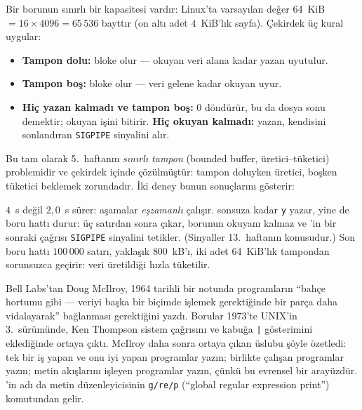 Bir borunun sınırlı bir kapasitesi vardır: Linux'ta varsayılan değer $64$~KiB $= 16 \times 4096 = 65\,536$ bayttır (on altı adet $4$~KiB'lık sayfa). Çekirdek üç kural uygular:
\begin{itemize}
  \item \textbf{Tampon dolu:}  bloke olur --- okuyan veri alana kadar yazan uyutulur.
  \item \textbf{Tampon boş:}  bloke olur --- veri gelene kadar okuyan uyur.
  \item \textbf{Hiç yazan kalmadı ve tampon boş:}  $0$ döndürür, bu da dosya sonu demektir; okuyan işini bitirir. \textbf{Hiç okuyan kalmadı:} yazan, kendisini sonlandıran \texttt{SIGPIPE} sinyalini alır.
\end{itemize}
Bu tam olarak 5.~haftanın \emph{sınırlı tampon} (bounded buffer, üretici--tüketici) problemidir ve çekirdek içinde çözülmüştür: tampon doluyken üretici, boşken tüketici beklemek zorundadır. İki deney bunun sonuçlarını gösterir:



 $4$~s değil $2{,}0$~s sürer: aşamalar \emph{eşzamanlı} çalışır.  sonsuza kadar \texttt{y} yazar, yine de boru hattı durur: üç satırdan sonra  çıkar, borunun okuyanı kalmaz ve 'in bir sonraki  çağrısı \texttt{SIGPIPE} sinyalini tetikler. (Sinyaller 13.~haftanın konusudur.) Son boru hattı $100\,000$ satırı, yaklaşık $800$~kB'ı, iki adet $64$~KiB'lık tampondan sorunsuzca geçirir: veri üretildiği hızla tüketilir.

\begin{histnote}
Bell Labs'tan Doug McIlroy, 1964 tarihli bir notunda programların ``bahçe hortumu gibi --- veriyi başka bir biçimde işlemek gerektiğinde bir parça daha vidalayarak'' bağlanması gerektiğini yazdı. Borular 1973'te UNIX'in 3.~sürümünde, Ken Thompson  sistem çağrısını ve kabuğa \texttt{|} gösterimini eklediğinde ortaya çıktı. McIlroy daha sonra ortaya çıkan üslubu şöyle özetledi: tek bir iş yapan ve onu iyi yapan programlar yazın; birlikte çalışan programlar yazın; metin akışlarını işleyen programlar yazın, çünkü bu evrensel bir arayüzdür. 'in adı da  metin düzenleyicisinin \texttt{g/re/p} (``global regular expression print'') komutundan gelir.
\end{histnote}

